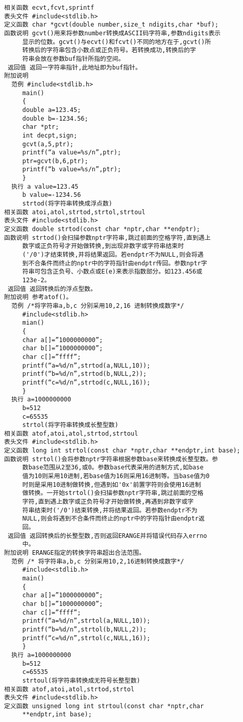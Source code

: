 \begin{verbatim}
相关函数 ecvt,fcvt,sprintf
表头文件 #include<stdlib.h>
定义函数 char *gcvt(double number,size_t ndigits,char *buf);
函数说明 gcvt()用来将参数number转换成ASCII码字符串,参数ndigits表示
     显示的位数。gcvt()与ecvt()和fcvt()不同的地方在于,gcvt()所
     转换后的字符串包含小数点或正负符号。若转换成功,转换后的字
     符串会放在参数buf指针所指的空间。
 返回值 返回一字符串指针,此地址即为buf指针。
附加说明
  范例 #include<stdlib.h>
     main()
     {
     double a=123.45;
     double b=-1234.56;
     char *ptr;
     int decpt,sign;
     gcvt(a,5,ptr);
     printf(“a value=%s/n”,ptr);
     ptr=gcvt(b,6,ptr);
     printf(“b value=%s/n”,ptr);
     }
  执行 a value=123.45
     b value=-1234.56
     strtod(将字符串转换成浮点数)
相关函数 atoi,atol,strtod,strtol,strtoul
表头文件 #include<stdlib.h>
定义函数 double strtod(const char *nptr,char **endptr);
函数说明 strtod()会扫描参数nptr字符串,跳过前面的空格字符,直到遇上
     数字或正负符号才开始做转换,到出现非数字或字符串结束时
     ('/0')才结束转换,并将结果返回。若endptr不为NULL,则会将遇
     到不合条件而终止的nptr中的字符指针由endptr传回。参数nptr字
     符串可包含正负号、小数点或E(e)来表示指数部分。如123.456或
     123e-2。
 返回值 返回转换后的浮点型数。
附加说明 参考atof()。
  范例 /*将字符串a,b,c 分别采用10,2,16 进制转换成数字*/
     #include<stdlib.h>
     mian()
     {
     char a[]=”1000000000”;
     char b[]=”1000000000”;
     char c[]=”ffff”;
     printf(“a=%d/n”,strtod(a,NULL,10));
     printf(“b=%d/n”,strtod(b,NULL,2));
     printf(“c=%d/n”,strtod(c,NULL,16));
     }
  执行 a=1000000000
     b=512
     c=65535
     strtol(将字符串转换成长整型数)
相关函数 atof,atoi,atol,strtod,strtoul
表头文件 #include<stdlib.h>
定义函数 long int strtol(const char *nptr,char **endptr,int base);
函数说明 strtol()会将参数nptr字符串根据参数base来转换成长整型数。参
     数base范围从2至36,或0。参数base代表采用的进制方式,如base
     值为10则采用10进制,若base值为16则采用16进制等。当base值为0
     时则是采用10进制做转换,但遇到如'0x'前置字符则会使用16进制
     做转换。一开始strtol()会扫描参数nptr字符串,跳过前面的空格
     字符,直到遇上数字或正负符号才开始做转换,再遇到非数字或字
     符串结束时('/0')结束转换,并将结果返回。若参数endptr不为
     NULL,则会将遇到不合条件而终止的nptr中的字符指针由endptr返
     回。
 返回值 返回转换后的长整型数,否则返回ERANGE并将错误代码存入errno
     中。
附加说明 ERANGE指定的转换字符串超出合法范围。
  范例 /* 将字符串a,b,c 分别采用10,2,16进制转换成数字*/
     #include<stdlib.h>
     main()
     {
     char a[]=”1000000000”;
     char b[]=”1000000000”;
     char c[]=”ffff”;
     printf(“a=%d/n”,strtol(a,NULL,10));
     printf(“b=%d/n”,strtol(b,NULL,2));
     printf(“c=%d/n”,strtol(c,NULL,16));
     }
  执行 a=1000000000
     b=512
     c=65535
     strtoul(将字符串转换成无符号长整型数)
相关函数 atof,atoi,atol,strtod,strtol
表头文件 #include<stdlib.h>
定义函数 unsigned long int strtoul(const char *nptr,char
     **endptr,int base);


\end{verbatim}
